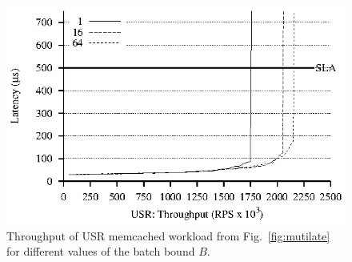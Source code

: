 \begin{figure}
\begin{centering}
\includegraphics{figs/batch-mutilate.eps}
\caption{Throughput of USR memcached workload from Fig.~\ref{fig:mutilate} for different values of the batch bound $B$.}
\label{fig:batch-mutilate}
\end{centering}
\end{figure}

